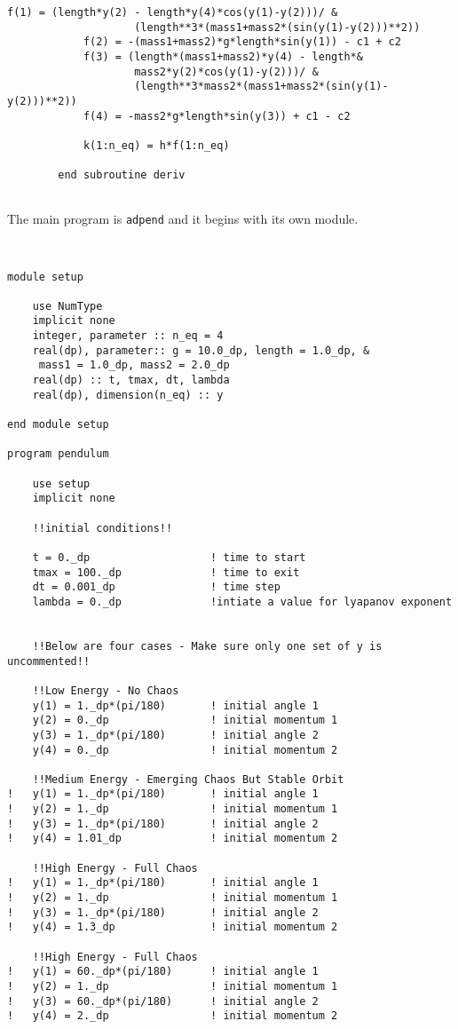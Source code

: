 \documentclass[12pt]{article}
\begin{document}
\begin{lstlisting}[frame=single,caption={ {\tt rkf45.f95}},label=module]
			f(1) = (length*y(2) - length*y(4)*cos(y(1)-y(2)))/ &
					(length**3*(mass1+mass2*(sin(y(1)-y(2)))**2))
			f(2) = -(mass1+mass2)*g*length*sin(y(1)) - c1 + c2
			f(3) = (length*(mass1+mass2)*y(4) - length*&
					mass2*y(2)*cos(y(1)-y(2)))/ &
					(length**3*mass2*(mass1+mass2*(sin(y(1)-y(2)))**2))
			f(4) = -mass2*g*length*sin(y(3)) + c1 - c2
	        
	        k(1:n_eq) = h*f(1:n_eq)
	        
        end subroutine deriv


\end{lstlisting}

The main program is {\tt adpend} and it begins with its own module. 

\begin{lstlisting}[frame=single,caption={{\tt adpend.f95}},label=adpend]


module setup

	use NumType
	implicit none
	integer, parameter :: n_eq = 4
	real(dp), parameter:: g = 10.0_dp, length = 1.0_dp, &
	 mass1 = 1.0_dp, mass2 = 2.0_dp
	real(dp) :: t, tmax, dt, lambda
	real(dp), dimension(n_eq) :: y
	
end module setup

program pendulum

	use setup
	implicit none

	!!initial conditions!!
		
	t = 0._dp					! time to start
	tmax = 100._dp				! time to exit
	dt = 0.001_dp				! time step
	lambda = 0._dp				!intiate a value for lyapanov exponent


	!!Below are four cases - Make sure only one set of y is uncommented!!

	!!Low Energy - No Chaos
	y(1) = 1._dp*(pi/180)		! initial angle 1
	y(2) = 0._dp				! initial momentum 1
	y(3) = 1._dp*(pi/180)		! initial angle 2
	y(4) = 0._dp				! initial momentum 2

	!!Medium Energy - Emerging Chaos But Stable Orbit
!  	y(1) = 1._dp*(pi/180)		! initial angle 1
!  	y(2) = 1._dp				! initial momentum 1
!  	y(3) = 1._dp*(pi/180)		! initial angle 2
!  	y(4) = 1.01_dp				! initial momentum 2

	!!High Energy - Full Chaos
! 	y(1) = 1._dp*(pi/180)		! initial angle 1
! 	y(2) = 1._dp				! initial momentum 1
! 	y(3) = 1._dp*(pi/180)		! initial angle 2
! 	y(4) = 1.3_dp				! initial momentum 2

	!!High Energy - Full Chaos
! 	y(1) = 60._dp*(pi/180)		! initial angle 1
! 	y(2) = 1._dp				! initial momentum 1
! 	y(3) = 60._dp*(pi/180)		! initial angle 2
! 	y(4) = 2._dp				! initial momentum 2


\end{lstlisting}
\end{document}
